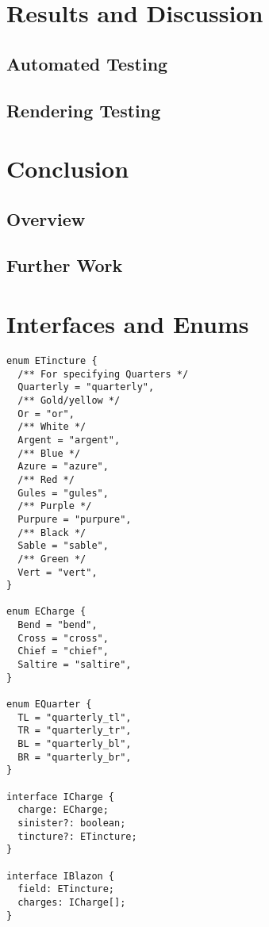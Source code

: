 \documentclass[nobib, a4paper, twoside, justified]{tufte-book}
\begin{document}
\chapter{Results and Discussion}%
\label{cha:results_and_discussion}

\section{Automated Testing}%
\label{sec:automated_testing}

\section{Rendering Testing}%
\label{sec:rendering_testing}

\chapter{Conclusion}%
\label{cha:conclusion}

\section{Overview}%
\label{sec:overview}

\section{Further Work}%
\label{sec:further_work}



\backmatter

\printbibliography[heading=bibintoc]

\appendix
{}

\chapter{Interfaces and Enums}%
\label{cha:interfaces_and_enums}

\begin{verbatim}
enum ETincture {
  /** For specifying Quarters */
  Quarterly = "quarterly",
  /** Gold/yellow */
  Or = "or",
  /** White */
  Argent = "argent",
  /** Blue */
  Azure = "azure",
  /** Red */
  Gules = "gules",
  /** Purple */
  Purpure = "purpure",
  /** Black */
  Sable = "sable",
  /** Green */
  Vert = "vert",
}

enum ECharge {
  Bend = "bend",
  Cross = "cross",
  Chief = "chief",
  Saltire = "saltire",
}

enum EQuarter {
  TL = "quarterly_tl",
  TR = "quarterly_tr",
  BL = "quarterly_bl",
  BR = "quarterly_br",
}

interface ICharge {
  charge: ECharge;
  sinister?: boolean;
  tincture?: ETincture;
}

interface IBlazon {
  field: ETincture;
  charges: ICharge[];
}
\end{verbatim}

\end{document}
